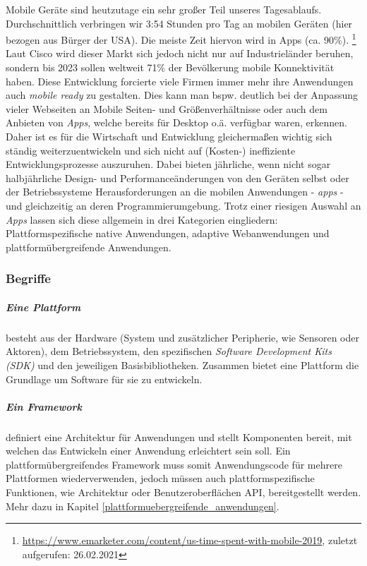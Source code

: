 Mobile Geräte sind heutzutage ein sehr großer Teil unseres Tagesablaufs. Durchschnittlich verbringen wir 3:54 Stunden pro Tag an mobilen Geräten (hier bezogen aus Bürger der USA). Die meiste Zeit hiervon wird in Apps (ca. 90\%). \footnote{\url{https://www.emarketer.com/content/us-time-spent-with-mobile-2019}, zuletzt aufgerufen: 26.02.2021} 
Laut Cisco wird dieser Markt sich jedoch nicht nur auf Industrieländer beruhen, sondern bis 2023 sollen weltweit 71\% der Bevölkerung mobile Konnektivität haben. \cite{cisco2020}
Diese Entwicklung forcierte viele Firmen immer mehr ihre Anwendungen auch \textit{mobile ready} zu gestalten. Dies kann man bspw. deutlich bei der Anpassung vieler Webseiten an Mobile Seiten- und Größenverhältnisse oder auch dem Anbieten von \textit{Apps}, welche bereits für Desktop o.ä. verfügbar waren, erkennen. \\

Daher ist es für die Wirtschaft und Entwicklung gleichermaßen wichtig sich ständig weiterzuentwickeln und sich nicht auf (Kosten-) ineffiziente Entwicklungsprozesse auszuruhen. Dabei bieten jährliche, wenn nicht sogar halbjährliche Design- und Performanceänderungen von den Geräten selbst oder der Betriebssysteme Herausforderungen an die mobilen Anwendungen - \textit{apps} - und gleichzeitig an deren Programmierumgebung. Trotz einer riesigen Auswahl an \textit{Apps} lassen sich diese allgemein in drei Kategorien eingliedern: Plattformspezifische native Anwendungen, adaptive Webanwendungen und plattformübergreifende Anwendungen.

\subsubsection{Begriffe}
\subparagraph{Eine Plattform} besteht aus der Hardware (System und zusätzlicher Peripherie, wie Sensoren oder Aktoren), dem Betriebssystem, den spezifischen \textit{Software Development Kits (SDK)} und den jeweiligen Basisbibliotheken. 
Zusammen bietet eine Plattform die Grundlage um Software für sie zu entwickeln.
\subparagraph{Ein \textit{Framework}} definiert eine Architektur für Anwendungen und stellt Komponenten bereit, mit welchen das Entwickeln einer Anwendung erleichtert sein soll. \cite{johnson1988} 
Ein plattformübergreifendes Framework muss somit Anwendungscode für mehrere Plattformen wiederverwenden, jedoch müssen auch plattformspezifische Funktionen, wie Architektur oder Benutzeroberflächen API, bereitgestellt werden. Mehr dazu in Kapitel \ref{plattformuebergreifende_anwendungen}.

